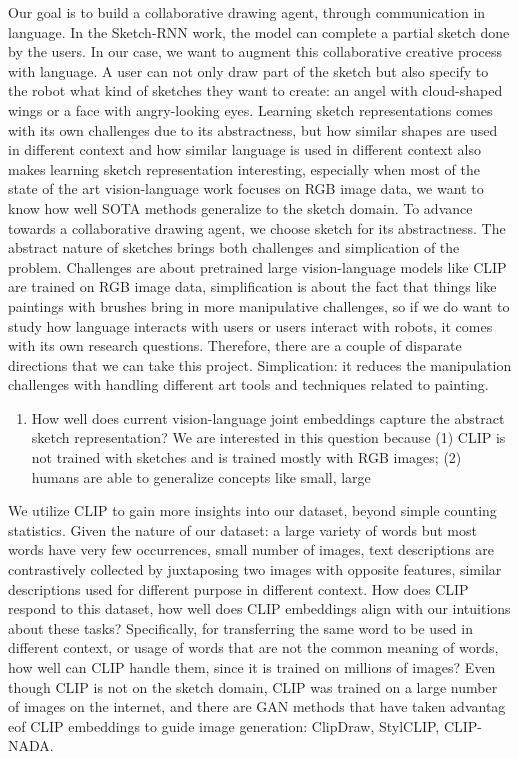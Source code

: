 
Our goal is to build a collaborative drawing agent, through communication in language. In the Sketch-RNN work, the model can complete a partial sketch done by the users. In our case, we want to augment this collaborative creative process with language. A user can not only draw part of the sketch but also specify to the robot what kind of sketches they want to create: an angel with cloud-shaped wings or a face with angry-looking eyes. 
Learning sketch representations comes with its own challenges due to its abstractness, but how similar shapes are used in different context and how similar language is used in different context also makes learning sketch representation interesting, especially when most of the state of the art vision-language work focuses on RGB image data, we want to know how well SOTA methods generalize to the sketch domain. To advance towards a collaborative drawing agent, we choose sketch for its abstractness. 
The abstract nature of sketches brings both challenges and simplication of the problem. Challenges are about pretrained large vision-language models like CLIP are trained on RGB image data, simplification is about the fact that things like paintings with brushes bring in more manipulative challenges, so if we do want to study how language interacts with users or users interact with robots, it comes with its own research questions. Therefore, there are a couple of disparate directions that we can take this project. Simplication: it reduces the manipulation challenges with handling different art tools and techniques related to painting.   
\begin{enumerate}
    \item How well does current vision-language joint embeddings capture the abstract sketch representation? We are interested in this question because (1) CLIP is not trained with sketches and is trained mostly with RGB images; (2) humans are able to generalize concepts like small, large  
\end{enumerate}

We utilize CLIP to gain more insights into our dataset, beyond simple counting statistics. Given the nature of our dataset: a large variety of words but most words have very few occurrences, small number of images, text descriptions are contrastively collected by juxtaposing two images with opposite features, similar descriptions used for different purpose in different context. How does CLIP respond to this dataset, how well does CLIP embeddings align with our intuitions about these tasks? Specifically, for transferring the same word to be used in different context, or usage of words that are not the common meaning of words, how well can CLIP handle them, since it is trained on millions of images? Even though CLIP is not on the sketch domain, CLIP was trained on a large number of images on the internet, and there are GAN methods that have taken advantag eof CLIP embeddings to guide image generation: ClipDraw, StylCLIP, CLIP-NADA.      

